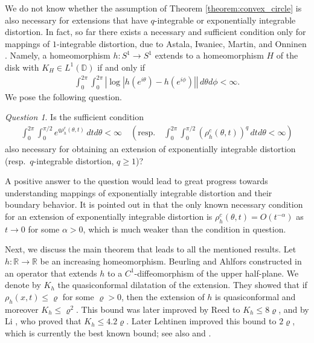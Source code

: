 \documentclass{amsart}
\theoremstyle{plain}
\theoremstyle{definition}
\theoremstyle{remark}
\newtheorem{question}[theorem]{Question}
\numberwithin{equation}{section}
\numberwithin{theorem}{section}
\numberwithin{conjecture}{section}
\newcommand{\R}{\mathbb R}
\newcommand{\D}{\mathbb D}
\newcommand{\1}{\mathbf 1}
\begin{document}
We do not know whether the assumption of Theorem \ref{theorem:convex_circle} is also necessary for extensions that have $q$-integrable or exponentially integrable distortion. In fact, so far there exists a necessary and sufficient condition only for mappings of $1$-integrable distortion, due to Astala, Iwaniec, Martin, and Onninen \cite[Theorem 11.1]{AstalaEtAl:ExtremalFiniteDistortion}. Namely, a homeomorphism $h\colon S^1\to S^1$ extends to a homeomorphism $H$ of the disk with $K_H\in L^1(\D)$ if and only if 
\begin{align*}
\int_{0}^{2\pi}\int_0^{2\pi}  \left |\log| h(e^{i\theta})-h(e^{i\phi})|  \right| \, d\theta d\phi<\infty.
\end{align*}
We pose the following question.
\begin{question}\label{question:necessary}
Is the sufficient condition
\begin{align*}
\int_0^{2\pi} \int_0^{\pi/2} e^{q \rho_h^c(\theta,t)} \, dtd\theta <\infty \quad \left(\textrm{resp.}\quad \int_0^{2\pi} \int_0^{\pi/2} \left(\rho_h^c(\theta,t)\right)^q \, dtd\theta <\infty \right)
\end{align*}
also necessary for obtaining an extension of exponentially integrable distortion (resp.\ $q$-integrable distortion, $q\geq 1$)?
\end{question}
A positive answer to the question would lead to great progress towards understanding mappings of exponentially integrable distortion and their boundary behavior. It is pointed out in \cite[pp.~248--249]{Zakeri:boundary} that the only known necessary condition for an extension of exponentially integrable distortion is $\rho_h^c(\theta,t) =O(t^{-\alpha})$ as $t\to0$ for some $\alpha>0$, which is much weaker than the condition in question. 

Next, we discuss the main theorem that leads to all the mentioned results. Let $h\colon \R \to \R$ be an increasing homeomorphism. Beurling and Ahlfors constructed in \cite{BeurlingAhlfors:extension} an operator that extends $h$ to a $C^1$-diffeomorphism of the upper half-plane. We denote by $K_h$ the quasiconformal dilatation of the extension. They showed that if  $\rho_h(x,t)\leq \varrho$ for some $\varrho>0$, then the extension of $h$ is quasiconformal and moreover $K_h\leq \varrho^2$. This bound was later improved by Reed  \cite{Reed:BeurlingAhlfors} to $K_h\leq 8\varrho$, and by Li \cite{Li:BeurlingAhlfors}, who proved that $K_h\leq 4.2\varrho$. Later Lehtinen \cite{Lehtinen:BeurlingAhlfors} improved this bound to $2\varrho$, which is currently the best known bound; see also \cite{Lehtinen:BeurlingAhlfors2} and \cite{DeLin:BeurlingAhlfors}.
\end{document}
